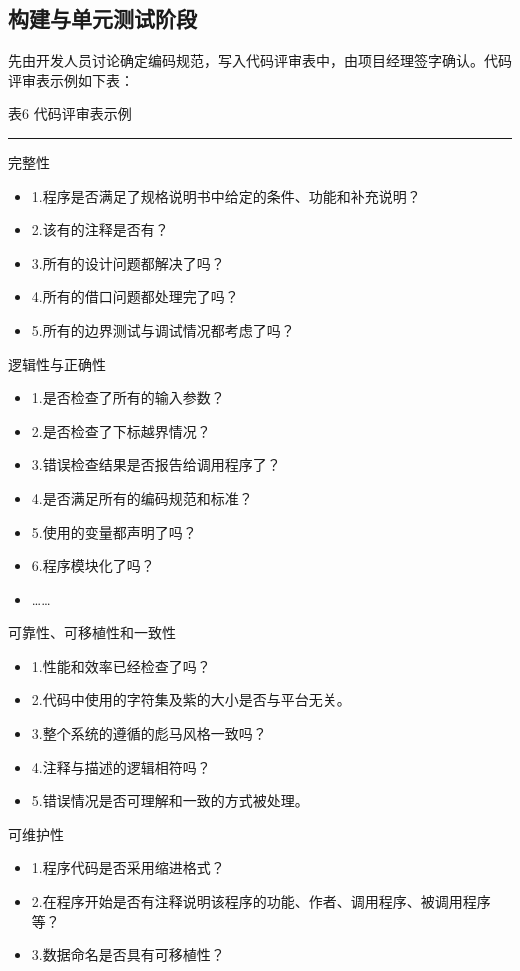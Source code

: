 \documentclass[UTF8,nofonts]{ctexart}
\begin{document}
\subsection{构建与单元测试阶段} %
\label{ssub:构建与单元测试_}
先由开发人员讨论确定编码规范，写入代码评审表中，由项目经理签字确认。代码评审表示例如下表：
\begin{center}
	表6 代码评审表示例
\end{center}
\noindent\rule[0.25\baselineskip]{\textwidth}{2pt}
完整性
\begin{itemize}
\setlength{\itemsep}{0pt}
\setlength{\parskip}{0pt}
\setlength{\parsep}{0pt}
	\item 1.程序是否满足了规格说明书中给定的条件、功能和补充说明？
	\item 2.该有的注释是否有？
	\item 3.所有的设计问题都解决了吗？
	\item 4.所有的借口问题都处理完了吗？
	\item 5.所有的边界测试与调试情况都考虑了吗？
\end{itemize}
逻辑性与正确性
\begin{itemize}
\setlength{\itemsep}{0pt}
\setlength{\parskip}{0pt}
\setlength{\parsep}{0pt}
	\item 1.是否检查了所有的输入参数？
	\item 2.是否检查了下标越界情况？
	\item 3.错误检查结果是否报告给调用程序了？
	\item 4.是否满足所有的编码规范和标准？
	\item 5.使用的变量都声明了吗？
	\item 6.程序模块化了吗？
	\item ……
\end{itemize}
可靠性、可移植性和一致性
\begin{itemize}
\setlength{\itemsep}{0pt}
\setlength{\parskip}{0pt}
\setlength{\parsep}{0pt}
	\item 1.性能和效率已经检查了吗？
	\item 2.代码中使用的字符集及紫的大小是否与平台无关。
	\item 3.整个系统的遵循的彪马风格一致吗？
	\item 4.注释与描述的逻辑相符吗？
	\item 5.错误情况是否可理解和一致的方式被处理。
\end{itemize}
可维护性
\begin{itemize}
\setlength{\itemsep}{0pt}
\setlength{\parskip}{0pt}
\setlength{\parsep}{0pt}
	\item 1.程序代码是否采用缩进格式？
	\item 2.在程序开始是否有注释说明该程序的功能、作者、调用程序、被调用程序等？
	\item 3.数据命名是否具有可移植性？
\end{itemize}
\end{document}
